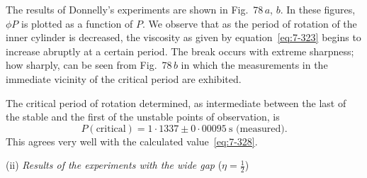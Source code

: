 The results of Donnelly's experiments are shown in Fig.~78\,$a$, $b$.  In
these figures, $\phi P$ is plotted as a function of $P$.  We observe that as the
period of rotation of the inner cylinder is decreased, the viscosity as
given by equation~\eqref{eq:7-323} begins to increase abruptly at a certain period.
The break occurs with extreme sharpness; how sharply, can be seen from
Fig.~78\,$b$ in which the measurements in the immediate vicinity of the
critical period are exhibited.

The critical period of rotation determined, as intermediate between
the last of the stable and the first of the unstable points of observation, is
\begin{equation}\label{eq:7-329}
P(\text{critical}) = 1{\cdot}1337 \pm 0{\cdot}00095~\text{s (measured)}.
\end{equation}
This agrees very well with the calculated value~\eqref{eq:7-328}.



\medskip
\noindent (ii) \textit{Results of the experiments with the wide gap} ($\eta = \frac{1}{2}$)

